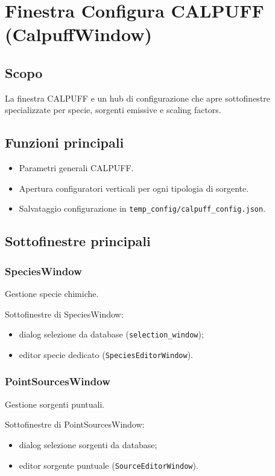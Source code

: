 \chapter{Finestra Configura CALPUFF (CalpuffWindow)}

\section{Scopo}
La finestra CALPUFF e un hub di configurazione che apre sottofinestre specializzate per specie, sorgenti emissive e scaling factors.

\section{Funzioni principali}
\begin{itemize}[leftmargin=1.5em]
  \item Parametri generali CALPUFF.
  \item Apertura configuratori verticali per ogni tipologia di sorgente.
  \item Salvataggio configurazione in \texttt{temp\_config/calpuff\_config.json}.
\end{itemize}

\section{Sottofinestre principali}
\subsection{SpeciesWindow}
Gestione specie chimiche.

Sottofinestre di SpeciesWindow:
\begin{itemize}[leftmargin=1.5em]
  \item dialog selezione da database (\texttt{selection\_window});
  \item editor specie dedicato (\texttt{SpeciesEditorWindow}).
\end{itemize}

\subsection{PointSourcesWindow}
Gestione sorgenti puntuali.

Sottofinestre di PointSourcesWindow:
\begin{itemize}[leftmargin=1.5em]
  \item dialog selezione sorgenti da database;
  \item editor sorgente puntuale (\texttt{SourceEditorWindow}).
\end{itemize}

